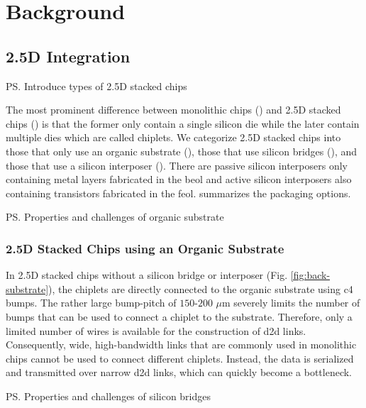 \section{Background}
\label{sec:back}

\subsection{2.5D Integration}
\label{ssec:back-25D}

\ps{Introduce types of 2.5D stacked chips}

The most prominent difference between monolithic chips () and 2.5D stacked chips () is that the former only contain a single silicon die while the later contain multiple dies which are called chiplets.
We categorize 2.5D stacked chips into those that only use an organic substrate (), those that use silicon bridges (), and those that use a silicon interposer ().
There are passive silicon interposers \cite{psi, ops-vs-psi} only containing metal layers fabricated in the \gls{beol} and active silicon interposers \cite{intact, first-act-int} also containing transistors fabricated in the \gls{feol}.
 summarizes the packaging options.



\ps{Properties and challenges of organic substrate}

\subsubsection{2.5D Stacked Chips using an Organic Substrate}
\label{sssec:back-substrate}

In 2.5D stacked chips without a silicon bridge or interposer (Fig.  \ref{fig:back-substrate}), the chiplets are directly connected to the organic substrate using \gls{c4} bumps. 
The rather large bump-pitch of $150$-$200$ $\mu$m severely limits the number of bumps that can be used to connect a chiplet to the substrate.
Therefore, only a limited number of wires is available for the construction of \gls{d2d} links. 
Consequently, wide, high-bandwidth links that are commonly used in monolithic chips cannot be used to connect different chiplets.
Instead, the data is serialized and transmitted over narrow \gls{d2d} links, which can quickly become a bottleneck.

\ps{Properties and challenges of silicon bridges}

